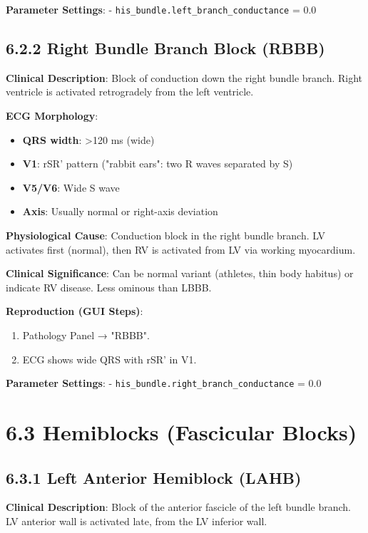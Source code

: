 \documentclass[12pt,oneside,a4paper]{book}
\newcommand{\code}[1]{\texttt{#1}}
\begin{document}
\textbf{Parameter Settings}:
- \code{his\_bundle.left\_branch\_conductance} = 0.0

\subsection{6.2.2 Right Bundle Branch Block (RBBB)}

\textbf{Clinical Description}:
Block of conduction down the right bundle branch. Right ventricle is activated retrogradely from the left ventricle.

\textbf{ECG Morphology}:
\begin{itemize}
  \item \textbf{QRS width}: \textgreater 120 ms (wide)
  \item \textbf{V1}: rSR' pattern ("rabbit ears": two R waves separated by S)
  \item \textbf{V5/V6}: Wide S wave
  \item \textbf{Axis}: Usually normal or right-axis deviation
\end{itemize}

\textbf{Physiological Cause}:
Conduction block in the right bundle branch. LV activates first (normal), then RV is activated from LV via working myocardium.

\textbf{Clinical Significance}:
Can be normal variant (athletes, thin body habitus) or indicate RV disease. Less ominous than LBBB.

\textbf{Reproduction (GUI Steps)}:
\begin{enumerate}
  \item Pathology Panel → "RBBB".
  \item ECG shows wide QRS with rSR' in V1.
\end{enumerate}

\textbf{Parameter Settings}:
- \code{his\_bundle.right\_branch\_conductance} = 0.0

\section{6.3 Hemiblocks (Fascicular Blocks)}

\subsection{6.3.1 Left Anterior Hemiblock (LAHB)}

\textbf{Clinical Description}:
Block of the anterior fascicle of the left bundle branch. LV anterior wall is activated late, from the LV inferior wall.
\end{document}
